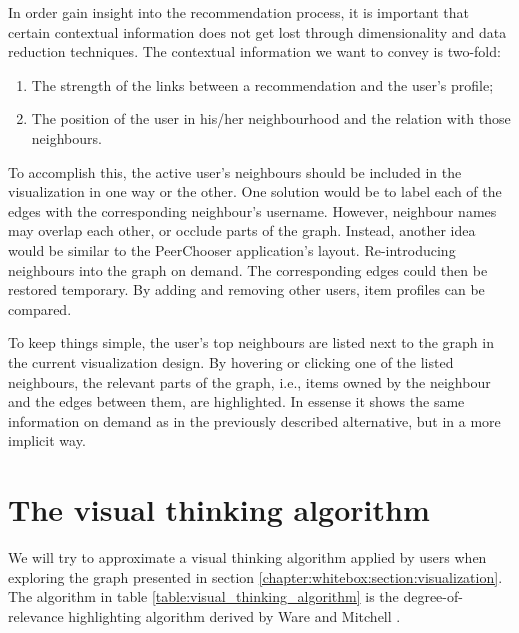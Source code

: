 In order gain insight into the recommendation process, it is important that certain contextual information does not get lost through dimensionality and data reduction techniques. The contextual information we want to convey is two-fold:

\begin{enumerate}
	\item The strength of the links between a recommendation and the user's profile;
	\item The position of the user in his/her neighbourhood and the relation with those neighbours.
\end{enumerate}

To accomplish this, the active user's neighbours should be included in the visualization in one way or the other. One solution would be to label each of the edges with the corresponding neighbour's username. However, neighbour names may overlap each other, or occlude parts of the graph. Instead, another idea would be similar to the PeerChooser application's layout. Re-introducing neighbours into the graph on demand. The corresponding edges could then be restored temporary. By adding and removing other users, item profiles can be compared.

To keep things simple, the user's top neighbours are listed next to the graph in the current visualization design. By hovering or clicking one of the listed neighbours, the relevant parts of the graph, i.e., items owned by the neighbour and the edges between them, are highlighted. In essense it shows the same information on demand as in the previously described alternative, but in a more implicit way.




\section{The visual thinking algorithm}\label{chapter:whitebox:section:algorithm}

We will try to approximate a visual thinking algorithm applied by users when exploring the graph presented in section \ref{chapter:whitebox:section:visualization}. The algorithm in table \ref{table:visual_thinking_algorithm} is the degree-of-relevance highlighting algorithm derived by Ware and Mitchell \cite{ware:2004}.

